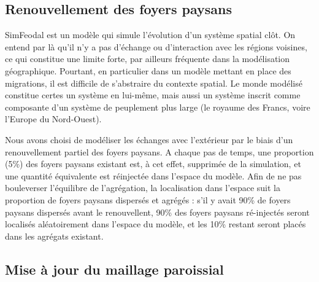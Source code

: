 \subsection{Renouvellement des foyers paysans \label{meca-renouvellement}}

SimFeodal est un modèle qui simule l'évolution d'un système spatial clôt.
On entend par là qu'il n'y a pas d'échange ou d'interaction avec les régions voisines, ce qui constitue une limite forte, par ailleurs fréquente dans la modélisation géographique.
Pourtant, en particulier dans un modèle mettant en place des migrations, il est difficile de s'abstraire du contexte spatial.
Le monde modélisé constitue certes un système en lui-même, mais aussi un système inscrit comme composante d'un système de peuplement plus large (le royaume des Francs, voire l'Europe du Nord-Ouest).

\begin{tcolorbox}[breakable,left=0pt,right=0pt,top=0pt,bottom=0pt,
	colback=gray!15,colframe=gray!15,width=\dimexpr\textwidth\relax, 
	enlarge left by=0mm, boxsep=5pt,arc=0pt,outer arc=0pt]
Nous avons choisi de modéliser les échanges avec l'extérieur par le biais d'un renouvellement partiel des foyers paysans.
A chaque pas de temps, une proportion (5\%) des foyers paysans existant est, à cet effet, supprimée de la simulation, et une quantité équivalente est réinjectée dans l'espace du modèle.
Afin de ne pas bouleverser l'équilibre de l'agrégation, la localisation dans l'espace suit la proportion de foyers paysans dispersés et agrégés :
s'il y avait 90\% de foyers paysans dispersés avant le renouvellent, 90\% des foyers paysans ré-injectés seront localisés aléatoirement dans l'espace du modèle, et les 10\% restant seront placés dans les agrégats existant\footnotemark.
\end{tcolorbox}

\subsection{Mise à jour du maillage paroissial}

